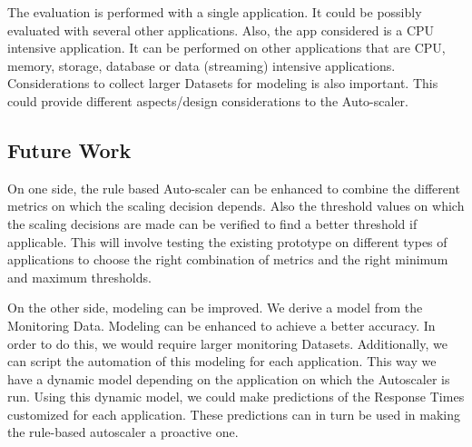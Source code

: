\documentclass[article,type=msc,colorback,12pt,accentcolor=tud7b,table]{tudthesis}
\begin{document}
 The evaluation is performed with a single application. It could be possibly evaluated with several other applications. Also, the app considered is a CPU intensive application. It can be performed on other applications that are CPU, memory, storage, database or data (streaming) intensive applications. Considerations to collect larger Datasets for modeling is also important. This could provide different aspects/design considerations to the Auto-scaler.
 
 
\subsection{Future Work}

On one side, the rule based Auto-scaler can be enhanced to combine the different metrics on which the scaling decision depends. Also the threshold values on which the scaling decisions are made can be verified to find a better threshold if applicable. This will involve testing the existing prototype on different types of applications to choose the right combination of metrics and the right minimum and maximum thresholds. 

On the other side, modeling can be improved. We derive a model from the Monitoring Data. Modeling can be enhanced to achieve a better accuracy. In order to do this, we would require larger monitoring Datasets. Additionally, we can script the automation of this modeling for each application. This way we have a dynamic model depending on the application on which the Autoscaler is run. Using this dynamic model, we could make predictions of the Response Times customized for each application. These predictions can in turn be used in making the rule-based autoscaler a proactive one. 

\clearpage
	  

	  
\end{document}
